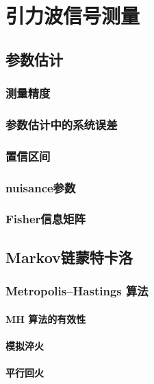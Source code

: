 
\chapter{引力波信号测量}
\label{chap7}

\section{参数估计}
\subsection{测量精度}
\subsection{参数估计中的系统误差}
\subsection{置信区间}
\subsection{nuisance参数}
\subsection{Fisher信息矩阵}

\section{Markov链蒙特卡洛}
\subsection{Metropolis–Hastings 算法}
\subsubsection{MH 算法的有效性}
\subsubsection{模拟淬火} 
\subsubsection{平行回火}
